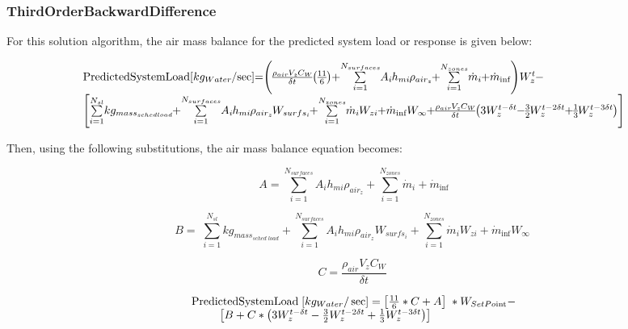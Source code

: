 \subsubsection{ThirdOrderBackwardDifference}\label{thirdorderbackwarddifference-001}

For this solution algorithm, the air mass balance for the predicted system load or response is given below:

{\scriptsize
\begin{equation}
\medmuskip=0mu
\thinmuskip=0mu
\thickmuskip=0mu
\nulldelimiterspace=0pt
\scriptspace=0pt
\begin{array}{l}{\rm{PredictedSystemLoad}}\;[k{g_{Water}}/\sec ] = \left( {\frac{{{\rho_{air}}{V_z}{C_W}}}{{\delta t}}\left( {\frac{{11}}{6}} \right) + \sum\limits_{i = 1}^{{N_{surfaces}}} {{A_i}{h_{mi}}} {\rho_{ai{r_z}}} + \sum\limits_{i = 1}^{{N_{zones}}} {{{\dot m}_i}}  + {{\dot m}_{\inf }}} \right)W_z^t - \\\;\;\;\left[ {\sum\limits_{i = 1}^{{N_{sl}}} {k{g_{mas{s_{sched\;load}}}}}  + \sum\limits_{i = 1}^{{N_{surfaces}}} {{A_i}{h_{mi}}} {\rho_{ai{r_z}}}{W_{surf{s_i}}} + \sum\limits_{i = 1}^{{N_{zones}}} {{{\dot m}_i}} {W_{zi}} + {{\dot m}_{\inf }}{W_\infty } + \frac{{{\rho_{air}}{V_z}{C_W}}}{{\delta t}}\left( {3W_z^{t - \delta t} - \frac{3}{2}W_z^{t - 2\delta t} + \frac{1}{3}W_z^{t - 3\delta t}} \right)} \right]\;\;\end{array}
\end{equation}}

Then, using the following substitutions, the air mass balance equation becomes:

\begin{equation}
A = \sum\limits_{i = 1}^{{N_{surfaces}}} {{A_i}{h_{mi}}} {\rho_{ai{r_z}}} + \sum\limits_{i = 1}^{{N_{zones}}} {{{\dot m}_i}}  + {\dot m_{\inf }}
\end{equation}

\begin{equation}
B = \;\sum\limits_{i = 1}^{{N_{sl}}} {k{g_{mas{s_{sched\;load}}}}}  + \sum\limits_{i = 1}^{{N_{surfaces}}} {{A_i}{h_{mi}}} {\rho_{ai{r_z}}}{W_{surf{s_i}}} + \sum\limits_{i = 1}^{{N_{zones}}} {{{\dot m}_i}} {W_{zi}} + {\dot m_{\inf }}{W_\infty }\;
\end{equation}

\begin{equation}
C = \frac{{{\rho_{air}}{V_z}{C_W}}}{{\delta t}}\;
\end{equation}

\begin{equation}
\begin{array}{l}{\rm{PredictedSystemLoad}}\;[k{g_{Water}}/\sec ] = \left[ {\frac{{11}}{6}*C + A} \right]\;*{W_{SetPo{\mathop{\rm int}} }} - \\\;\;\;\;\;\;\;\;\;\left[ {B + C*\left( {3W_z^{t - \delta t} - \frac{3}{2}W_z^{t - 2\delta t} + \frac{1}{3}W_z^{t - 3\delta t}} \right)} \right]\end{array}
\end{equation}


